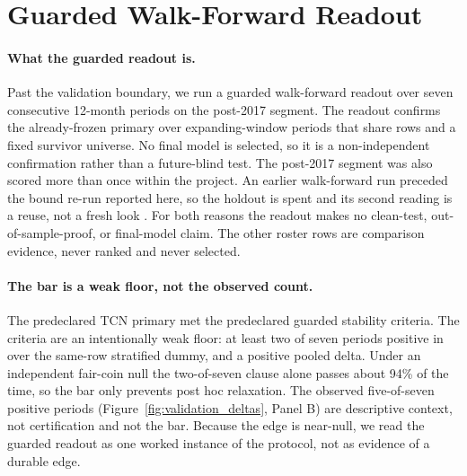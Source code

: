 \section{Guarded Walk-Forward Readout}\label{sec:guarded}

\paragraph{What the guarded readout is.}
Past the validation boundary, we run a guarded walk-forward readout over seven
consecutive 12-month periods on the post-2017 segment. The readout confirms the
already-frozen primary over expanding-window periods that share rows and a fixed
survivor universe. No final model is selected, so it is a non-independent
confirmation rather than a future-blind test. The post-2017 segment was also scored
more than once within the project. An earlier walk-forward run preceded the bound re-run
reported here, so the holdout is spent and its second reading is a reuse, not a fresh
look \cite{dwork2015reusable}. For both reasons the readout makes no clean-test,
out-of-sample-proof, or final-model claim. The other roster rows are comparison
evidence, never ranked and never selected.

\paragraph{The bar is a weak floor, not the observed count.}
The predeclared TCN primary met the predeclared guarded stability criteria. The
criteria are an intentionally weak floor: at least two of seven periods positive in
\macrofone{} over the same-row stratified dummy, and a positive pooled delta. Under an
independent fair-coin null the two-of-seven clause alone passes about 94\% of the time,
so the bar only prevents post hoc relaxation. The observed five-of-seven positive
periods (Figure~\ref{fig:validation_deltas}, Panel B) are descriptive context, not
certification and not the bar. Because the edge is near-null, we read the guarded readout
as one worked instance of the protocol, not as evidence of a durable edge.

